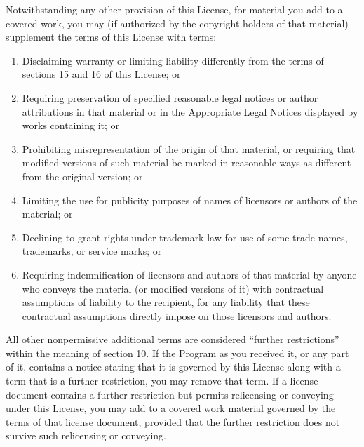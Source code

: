 \documentclass[letterpaper,10pt,english]{sphinxmanual}
\begin{document}
\sphinxAtStartPar
Notwithstanding any other provision of this License, for material you add to a covered work, you may (if authorized by the copyright holders of that material) supplement the terms of this License with terms:
\begin{enumerate}
%
\item {} 
\sphinxAtStartPar
Disclaiming warranty or limiting liability differently from the terms of sections 15 and 16 of this License; or

\item {} 
\sphinxAtStartPar
Requiring preservation of specified reasonable legal notices or author attributions in that material or in the Appropriate Legal Notices displayed by works containing it; or

\item {} 
\sphinxAtStartPar
Prohibiting misrepresentation of the origin of that material, or requiring that modified versions of such material be marked in reasonable ways as different from the original version; or

\item {} 
\sphinxAtStartPar
Limiting the use for publicity purposes of names of licensors or authors of the material; or

\item {} 
\sphinxAtStartPar
Declining to grant rights under trademark law for use of some trade names, trademarks, or service marks; or

\item {} 
\sphinxAtStartPar
Requiring indemnification of licensors and authors of that material by anyone who conveys the material (or modified versions of it) with contractual assumptions of liability to the recipient, for any liability that these contractual assumptions directly impose on those licensors and authors.

\end{enumerate}

\sphinxAtStartPar
All other non\sphinxhyphen{}permissive additional terms are considered “further restrictions” within the meaning of section 10. If the Program as you received it, or any part of it, contains a notice stating that it is governed by this License along with a term that is a further restriction, you may remove that term. If a license document contains a further restriction but permits relicensing or conveying under this License, you may add to a covered work material governed by the terms of that license document, provided that the further restriction does not survive such relicensing or conveying.
\end{document}
